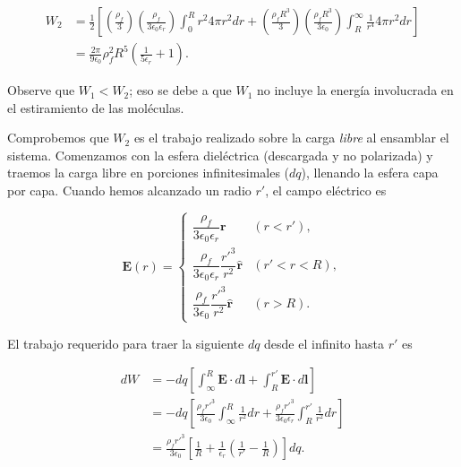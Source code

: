 \documentclass[12pt,a4paper]{report}
\newcommand{\esp}{\vspace{0.5cm}}
\begin{document}
	\esp
	
	\begin{equation}
		\begin{aligned}
			W_2 &= \frac{1}{2} \left[ \left( \frac{\rho_f}{3} \right) \left( \frac{\rho_f}{3\epsilon_0\epsilon_r} \right) \int_0^R r^2 4\pi r^2 dr + \left( \frac{\rho_f R^3}{3} \right) \left( \frac{\rho_f R^3}{3\epsilon_0} \right) \int_R^\infty \frac{1}{r^4} 4\pi r^2 dr \right] \\
			&= \frac{2\pi}{9\epsilon_0} \rho_f^2 R^5 \left( \frac{1}{5\epsilon_r} + 1 \right).
		\end{aligned}
	\end{equation}
	
	\esp
	
	Observe que $W_1 < W_2$; eso se debe a que $W_1$ no incluye la energía involucrada en el estiramiento de las moléculas.
	
	\esp
	
	Comprobemos que $W_2$ es el trabajo realizado sobre la carga \textit{libre} al ensamblar el sistema. Comenzamos con la esfera dieléctrica (descargada y no polarizada) y traemos la carga libre en porciones infinitesimales ($dq$), llenando la esfera capa por capa. Cuando hemos alcanzado un radio $r'$, el campo eléctrico es
	
	\esp
	
	\begin{equation}
		\mathbf{E}(r) = \begin{cases} \dfrac{\rho_f}{3\epsilon_0\epsilon_r} \mathbf{r} & (r < r'), \\ \dfrac{\rho_f}{3\epsilon_0\epsilon_r} \dfrac{r'^3}{r^2} \hat{\mathbf{r}} & (r' < r < R), \\ \dfrac{\rho_f}{3\epsilon_0} \dfrac{r'^3}{r^2} \hat{\mathbf{r}} & (r > R). \end{cases}
	\end{equation}
	
	\esp
	
	El trabajo requerido para traer la siguiente $dq$ desde el infinito hasta $r'$ es
	
	\esp
	
	\begin{equation}
		\begin{aligned}
			dW &= -dq \left[ \int_\infty^R \mathbf{E} \cdot d\mathbf{l} + \int_R^{r'} \mathbf{E} \cdot d\mathbf{l} \right] \\
			&= -dq \left[ \frac{\rho_f r'^3}{3\epsilon_0} \int_\infty^R \frac{1}{r^2} dr + \frac{\rho_f r'^3}{3\epsilon_0\epsilon_r} \int_R^{r'} \frac{1}{r^2} dr \right] \\
			&= \frac{\rho_f r'^3}{3\epsilon_0} \left[ \frac{1}{R} + \frac{1}{\epsilon_r} \left( \frac{1}{r'} - \frac{1}{R} \right) \right] dq.
		\end{aligned}
	\end{equation}
	
\end{document}

